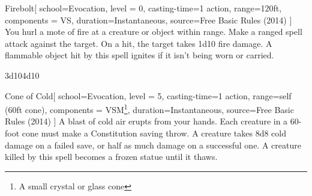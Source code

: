 \begin{ExampleBlock}{}
\begin{RpgSpell}{Firebolt}[
    school=Evocation,
    level = 0,
    casting-time=1 action,
    range=120ft,
    components = VS,
    duration=Instantaneous,
    source=Free Basic Rules (2014)
]
    You hurl a mote of fire at a creature or object within range. Make a ranged spell attack against the target. On a hit, the target takes 1d10 fire damage. A flammable object hit by this spell ignites if it isn't being worn or carried.

     {3d10}{4d10}
\end{RpgSpell}

\vspace{1cm}

\begin{RpgSpell}{Cone of Cold}[
    school=Evocation,
    level = 5,
    casting-time=1 action,
    range=self (60ft cone),
    components = VSM\footnote{A small crystal or glass cone},
    duration=Instantaneous,
    source=Free Basic Rules (2014)
]
    A blast of cold air erupts from your hands. Each creature in a 60-foot cone must make a Constitution saving throw. A creature takes 8d8 cold damage on a failed save, or half as much damage on a successful one. A creature killed by this spell becomes a frozen statue until it thaws.

\end{RpgSpell}


\end{ExampleBlock}
